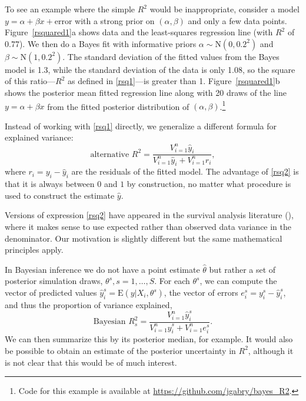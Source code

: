 \documentclass[11pt]{article}
\begin{document}
To see an example where the simple $R^2$ would be inappropriate, consider a model
$y = \alpha + \beta x+\mbox{error}$
with a strong prior on $(\alpha,\beta)$ and only a few data points.
Figure~\ref{rsquared1}a shows data and the least-squares regression line (with
$R^2$ of 0.77).  We then do a Bayes fit with informative priors
$\alpha \sim \mbox{N}(0,0.2^2)$ and $\beta \sim \mbox{N}(1,0.2^2)$.  The
standard deviation of the fitted values from the Bayes model is 1.3, while the
standard deviation of the data is only 1.08, so the square of this
ratio---$R^2$ as defined in \eqref{rsq1}---is greater than 1.
Figure~\ref{rsquared1}b shows the posterior mean fitted regression line along
with 20 draws of the line $y = \alpha + \beta x$ from the fitted posterior
distribution of $(\alpha,\beta)$.\footnote{Code for this example is available at \url{https://github.com/jgabry/bayes_R2}.}

Instead of working with \eqref{rsq1} directly, we generalize a different formula
for explained variance:
%
\begin{equation}\label{rsq2}
\mbox{alternative } R^2 = \frac{V_{i=1}^n\hat{y}_i}{V_{i=1}^n \hat{y}_i  + V_{i=1}^n r_i},
\end{equation}
%
where $r_i = y_i -\hat{y}_i$ are the residuals of the fitted model.
The advantage of \eqref{rsq2} is that it is always between $0$ and $1$ by
construction, no matter what procedure is used to construct the estimate
$\hat{y}$.

Versions of expression \eqref{rsq2} have appeared in the survival analysis
literature (\cite{KentOquigley1988, ChoodariRoystonParmar2010}), 
where it makes sense to use expected rather than observed data variance
in the denominator.  Our motivation is slightly different but the same
mathematical principles apply.

In Bayesian inference we do not have a point estimate $\hat{\theta}$ but rather
a set of posterior simulation draws, $\theta^s, s=1,\ldots,S$.
For each $\theta^s$, we can compute the vector of predicted values
$\hat{y}_i^s = \mbox{E}(y | X_i,\theta^s)$, the vector of errors
$e_i^s = y_i^s - \hat{y}_i^s$, and thus the proportion of variance explained,
%
\begin{equation}\label{rsq3}
\mbox{Bayesian } R^2_s=\frac{V_{i=1}^n\hat{y}_i^s}{V_{i=1}^n \hat{y}_i^s  + V_{i=1}^n e_i^s}.
\end{equation}
%
We can then summarize this by its posterior median, for example. It would also
be possible to obtain an estimate of the posterior uncertainty in $R^2$,
although it is not clear that this would be of much interest.
\end{document}

